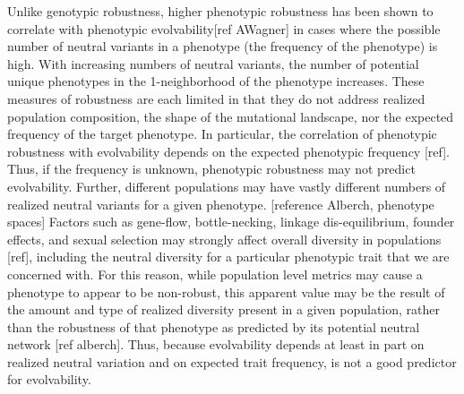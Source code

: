 Unlike genotypic robustness, higher phenotypic robustness has been shown to correlate with phenotypic evolvability[ref AWagner] in cases where the possible number of neutral variants in a phenotype (the frequency of the phenotype) is high. With increasing numbers of neutral variants, the number of potential unique phenotypes in the 1-neighborhood of the phenotype increases.
These measures of robustness are each limited in that they do not address realized population composition, the shape of the mutational landscape, nor the expected frequency of the target phenotype. In particular, the correlation of phenotypic robustness with evolvability depends on the expected phenotypic frequency [ref]. Thus, if the frequency is unknown, phenotypic robustness may not predict evolvability.
Further, different populations may have vastly different numbers of realized neutral variants for a given phenotype. [reference Alberch, phenotype spaces] Factors such as gene-flow, bottle-necking, linkage dis-equilibrium, founder effects, and sexual selection may strongly affect overall diversity in populations [ref], including the neutral diversity for a particular phenotypic trait that we are concerned with.
For this reason, while population level metrics may cause a phenotype to appear to be non-robust, this apparent value may be the result of the amount and type of realized diversity present in a given population, rather than the robustness of that phenotype as predicted by its potential neutral network [ref alberch]. Thus, because evolvability depends at least in part on realized neutral variation and on expected trait frequency,  is not a good predictor for evolvability.

